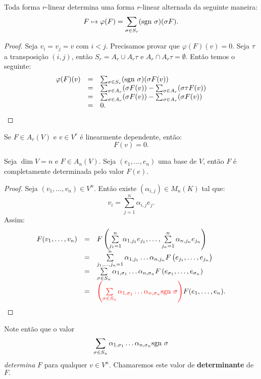 \documentclass[11pt,twoside,a4paper]{book}
\begin{document}
\begin{proposicao}
Toda forma $r$-linear determina uma forma $r$-linear alternada da seguinte maneira:
\[
F\mapsto\varphi(F)=\sum_{\sigma\in S_r}(\sgn \ \sigma)(\sigma F).
\]
\end{proposicao}
\begin{proof}
Seja $v_i=v_j=v$ com $i<j$. Precisamos provar que $\varphi(F)(v)=0$. Seja $\tau$ a transposição $(i,j)$, então $ S_r=A_r\cup A_r\tau$ e $A_r\cap A_r\tau=\emptyset$. Então temos o seguinte:
\[
\begin{array}{rcl}
\varphi(F)(v)&=&\sum_{\sigma\in S_r}({\rm sgn} \ \sigma)(\sigma F(v))\\&=&\sum_{\sigma\in A_r}(\sigma F(v))-\sum_{\sigma\in A_r}(\sigma\tau F(v))\\&=&\sum_{\sigma\in A_r}(\sigma F(v))-\sum_{\sigma\in A_r}(\sigma F(v))\\&=&0.
\end{array}
\]
\end{proof}

\begin{observacao}
Se $F\in A_r(V)$ e $v\in V^r$ é linearmente dependente, então:
\[
F(v)=0.
\]
\end{observacao}

\begin{lema}
Seja $\dim V=n$ e $F\in A_n(V)$. Seja $(e_1,\dots,e_n)$ uma base de $V$, então $F$ é completamente determinada pelo valor $F(e)$.
\end{lema}
\begin{proof}
Seja $(v_1,\dots,v_n)\in V^n$. Então existe $(\alpha_{i,j})\in M_n(K)$ tal que:
\[
v_i=\sum_{j=1}^n\alpha_{i,j}e_j.
\]
Assim:
\[
\begin{array}{rcl}
F(v_1,\dots,v_n)&=&F\left(\sum\limits_{j_1=1}^n\alpha_{1,j_1}e_{j_1},\dots,\sum\limits_{j_n=1}^n\alpha_{n,j_n}e_{j_n}\right)\\&=&\sum\limits_{j_1,\dots,j_n=1}^n\alpha_{1,j_1}\dots\alpha_{n,j_n}F\left(e_{j_1},\dots,e_{j_n}\right)\\&=&\sum\limits_{\sigma\in S_n}\alpha_{1,\sigma_1}\dots\alpha_{n,\sigma_n}F\left(e_{\sigma_1},\dots,e_{\sigma_n}\right)\\&=&\textcolor{red}{\left(\sum\limits_{\sigma\in S_n}\alpha_{1,\sigma_1}\dots\alpha_{n,\sigma_n} {\rm sgn} \ \sigma \right)} F(e_1,\dots,e_n).
\end{array}
\]
\end{proof}

\noindent
Note então que o valor
\[
\sum\limits_{\sigma\in S_n}\alpha_{1,\sigma_1}\dots\alpha_{n,\sigma_n} {\rm sgn} \ \sigma 
\]
\emph{determina} $F$ para qualquer $v \in V^n.$ Chamaremos este valor de \textbf{determinante} de $F.$
\end{document}
